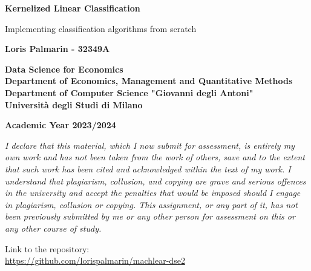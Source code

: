 \documentclass[a4paper, 10pt]{article}
\begin{document}
\begin{titlepage}
    \centering
    \vspace*{1cm}
    
    \Huge
    \textbf{Kernelized Linear Classification}
    
    \vspace{0.5cm}
    \LARGE
    Implementing classification algorithms from scratch
    
    \vspace{1.5cm}
    
    \textbf{Loris Palmarin - 32349A}
    
    \vfill
    
    \Large
    \textbf{Data Science for Economics\\}
    \textbf{Department of Economics, Management and Quantitative Methods\\}
    \textbf{Department of Computer Science "Giovanni degli Antoni"\\}
    \textbf{Università degli Studi di Milano}
    
    \vspace{0.8cm}
    
    \Large
    \textbf{Academic Year 2023/2024}
    
\end{titlepage}

\newpage

\thispagestyle{empty}

\vspace*{\fill}
\noindent
\textit{I declare that this material, which I now submit for assessment, is entirely my own work and has not been taken from the work of others, save and to the extent that such work has been cited and acknowledged within the text of my work. I understand that plagiarism, collusion, and copying are grave and serious offences in the university and accept the penalties that would be imposed should I engage in plagiarism, collusion or copying. This assignment, or any part of it, has not been previously submitted by me or any other person for assessment on this or any other course of study.}



\vspace{1.5cm}
\noindent
Link to the repository:\\
\url{https://github.com/lorispalmarin/machlear-dse2}

\vspace*{\fill}

\newpage
\end{document}
